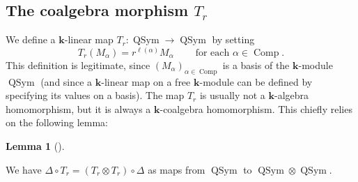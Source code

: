 \documentclass[numbers=enddot,12pt,final,onecolumn,notitlepage]{scrartcl}%
\theoremstyle{definition}
\newtheorem{lem}[theo]{Lemma}
\newenvironment{lemma}[1][]
{\begin{lem}[#1]\begin{leftbar}}
{\end{leftbar}\end{lem}}
\begin{document}
\subsection{The coalgebra morphism $T_{r}$}

We define a $\mathbf{k}$-linear map $T_{r}:\operatorname*{QSym}\rightarrow
\operatorname*{QSym}$ by setting%
\[
T_{r}\left(  M_{\alpha}\right)  =r^{\ell\left(  \alpha\right)  }M_{\alpha
}\ \ \ \ \ \ \ \ \ \ \text{for each }\alpha\in\operatorname*{Comp}.
\]
This definition is legitimate, since $\left(  M_{\alpha}\right)  _{\alpha
\in\operatorname*{Comp}}$ is a basis of the $\mathbf{k}$-module
$\operatorname*{QSym}$ (and since a $\mathbf{k}$-linear map on a free
$\mathbf{k}$-module can be defined by specifying its values on a basis). The
map $T_{r}$ is usually not a $\mathbf{k}$-algebra homomorphism, but it is
always a $\mathbf{k}$-coalgebra homomorphism. This chiefly relies on the
following lemma:

\begin{lemma}
\label{lem.Tr.Delta}We have $\Delta\circ T_{r}=\left(  T_{r}\otimes
T_{r}\right)  \circ\Delta$ as maps from $\operatorname*{QSym}$ to
$\operatorname*{QSym}\otimes\operatorname*{QSym}$.
\end{lemma}
\end{document}
